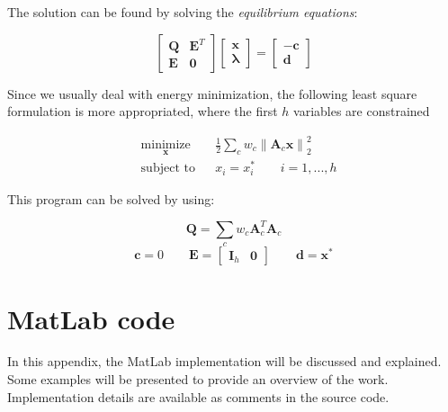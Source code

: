 \documentclass[a4paper,10pt]{article}
\begin{document}
\begin{multicols}{2}
The solution can be found by solving the \emph{equilibrium equations}:

\begin{equation*}
\begin{bmatrix} \mathbf{Q} & \mathbf{E}^T \\ \mathbf{E} & \mathbf{0} \end{bmatrix}
\begin{bmatrix} \mathbf{x} \\ \boldsymbol\lambda \end{bmatrix} =
\begin{bmatrix} - \mathbf{c} \\ \mathbf{d} \end{bmatrix}
\end{equation*}

Since we usually deal with energy minimization, the following least square formulation is more appropriated, where the first $h$ variables are constrained

\begin{equation*}
\begin{aligned}
& \underset{\mathbf{x}}{\text{minimize}} & & \frac{1}{2} \sum_c w_c \left\| \mathbf{A}_c\mathbf{x} \right\|_2^2 \\
& \text{subject to} & & x_i = x_i^* \qquad i = {1, ..., h}
\end{aligned}
\end{equation*}

This program can be solved by using:

\begin{equation*}
\mathbf{Q}=\sum_c w_c \mathbf{A}_c^T\mathbf{A}_c
\end{equation*}
\begin{equation*}
\mathbf{c}=0 \qquad \mathbf{E}=\begin{bmatrix} \mathbf{I}_h & \mathbf{0} \end{bmatrix} \qquad \mathbf{d}=\mathbf{x}^*
\end{equation*}


\section{MatLab code}

\lstset{language=MatLab}

In this appendix, the MatLab implementation will be discussed and explained.
Some examples will be presented to provide an overview of the work.
Implementation details are available as comments in the source code.


\end{multicols}
\end{document}
